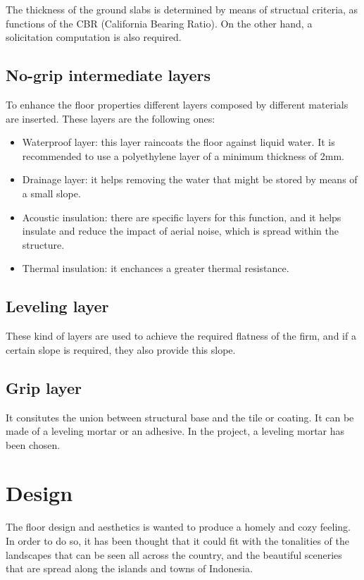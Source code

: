 	The thickness of the ground slabs is determined by means of structual criteria, as functions of the CBR (California Bearing Ratio). On the other hand, a solicitation computation is also required.
		\subsection{No-grip intermediate layers}
		
	To enhance the floor properties different layers composed by different materials are inserted. These layers are the following ones:
	\begin{itemize}
	\item Waterproof layer: this layer raincoats the floor against liquid water. It is recommended to use a polyethylene layer of a minimum thickness of 2mm. 
	\item Drainage layer: it helps removing the water that might be stored by means of a small slope. 
	\item Acoustic insulation: there are specific layers for this function, and it helps insulate and reduce the impact of aerial noise, which is spread within the structure.
	\item Thermal insulation: it enchances a greater thermal resistance.
	\end{itemize}
		\subsection{Leveling layer}
	These kind of layers are used to achieve the required flatness of the firm, and if a certain slope is required, they also provide this slope.
		\subsection{Grip layer}
	It consitutes the union between structural base and the tile or coating. It can be made of a leveling mortar or an adhesive. In the project, a leveling mortar has been chosen.
		
	\section{Design}
	The floor design and aesthetics is wanted to produce a homely and cozy feeling. In order to do so, it has been thought that it could fit with the tonalities of the landscapes that can be seen all across the country, and the beautiful sceneries that are spread along the islands and towns of Indonesia.
	
